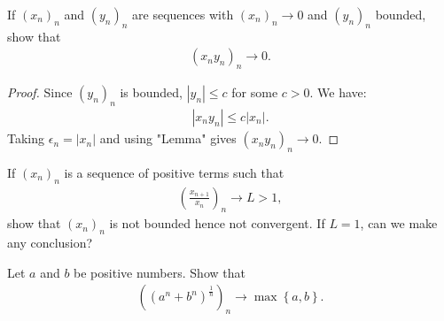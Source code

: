 \documentclass[10pt,twoside,openany]{memoir}
\begin{document}
    \begin{exercise}
        If $(x_n)_n$ and $(y_n)_n$ are sequences with $(x_n)_n \rightarrow 0$ and $(y_n)_n$ bounded, show that
            \begin{equation*}
            \begin{split}
                (x_n y_n)_n \rightarrow 0.
            \end{split}
            \end{equation*}
    \end{exercise}
        {\color{red} \begin{proof}
            Since $(y_n)_n$ is bounded, $|y_n| \leq c$ for some $c > 0$. We have:
                \begin{equation*}
                \begin{split}
                    |x_n y_n| \leq c|x_n|.
                \end{split}
                \end{equation*}
            Taking $\epsilon_n = |x_n|$ and using "Lemma" gives $(x_n y_n)_n \rightarrow 0$.
        \end{proof}}
    \begin{exercise}
        If $(x_n)_n$ is a sequence of positive terms such that
            \begin{equation*}
            \begin{split}
                \left(\frac{x_{n+1}}{x_n}\right)_n \rightarrow L > 1,
            \end{split}
            \end{equation*}
        show that $(x_n)_n$ is not bounded hence not convergent. If $L=1$, can we make any conclusion?
    \end{exercise}
    \begin{exercise}
        Let $a$ and $b$ be positive numbers. Show that
            \begin{equation*}
            \begin{split}
                \left((a^n+b^n)^\frac{1}{n}\right)_n \rightarrow \max \left\{a,b\right\}.
            \end{split}
            \end{equation*}
    \end{exercise}
\end{document}

